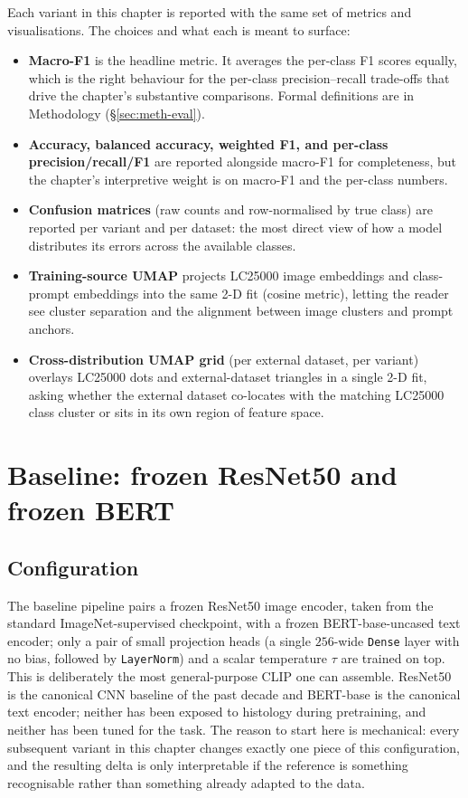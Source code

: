 Each variant in this chapter is reported with the same set of metrics and visualisations. The choices and what each is meant to surface:
\begin{itemize}
    \item \textbf{Macro-F1} is the headline metric. It averages the per-class F1 scores equally, which is the right behaviour for the per-class precision--recall trade-offs that drive the chapter's substantive comparisons. Formal definitions are in Methodology (§\ref{sec:meth-eval}).
    \item \textbf{Accuracy, balanced accuracy, weighted F1, and per-class precision/recall/F1} are reported alongside macro-F1 for completeness, but the chapter's interpretive weight is on macro-F1 and the per-class numbers.
    \item \textbf{Confusion matrices} (raw counts and row-normalised by true class) are reported per variant and per dataset: the most direct view of how a model distributes its errors across the available classes.
    \item \textbf{Training-source UMAP} projects LC25000 image embeddings and class-prompt embeddings into the same 2-D fit (cosine metric), letting the reader see cluster separation and the alignment between image clusters and prompt anchors.
    \item \textbf{Cross-distribution UMAP grid} (per external dataset, per variant) overlays LC25000 dots and external-dataset triangles in a single 2-D fit, asking whether the external dataset co-locates with the matching LC25000 class cluster or sits in its own region of feature space.
\end{itemize}


\section{Baseline: frozen ResNet50 and frozen BERT}
\label{sec:results-baseline}

\subsection{Configuration}
\label{sec:results-baseline-config}

The baseline pipeline pairs a frozen ResNet50 image encoder, taken from the standard ImageNet-supervised checkpoint, with a frozen BERT-base-uncased text encoder; only a pair of small projection heads (a single $256$-wide \texttt{Dense} layer with no bias, followed by \texttt{LayerNorm}) and a scalar temperature $\tau$ are trained on top. This is deliberately the most general-purpose CLIP one can assemble. ResNet50 is the canonical CNN baseline of the past decade and BERT-base is the canonical text encoder; neither has been exposed to histology during pretraining, and neither has been tuned for the task. The reason to start here is mechanical: every subsequent variant in this chapter changes exactly one piece of this configuration, and the resulting delta is only interpretable if the reference is something recognisable rather than something already adapted to the data.

